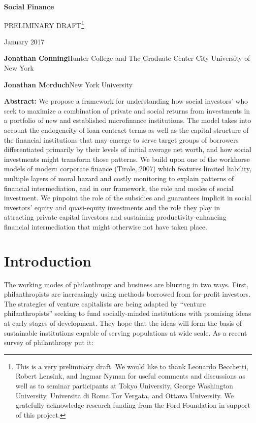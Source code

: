 \documentclass{article} %
\begin{document}
\noindent \textbf{Social Finance}

PRELIMINARY DRAFT\footnote{This is a very preliminary draft. We would like to thank Leonardo Becchetti, Robert Lensink, and Ingmar Nyman for useful comments and discussions as well as to seminar participants at Tokyo University, George Washington University, Universita di Roma Tor Vergata, and Ottawa University. We gratefully acknowledge research funding from the Ford Foundation in support of this project.}

\noindent January 2017

\noindent \textit{}



\noindent \textbf{}

\noindent \textbf{Jonathan Conning}Hunter College and The Graduate Center City University of New York 

\noindent \textbf{Jonathan M}o\textbf{rduch}New York University

\noindent 

\textbf{Abstract:  }We propose a framework for understanding how social investors' who seek to maximize a combination of private and social returns from investments in a portfolio of new and established microfinance institutions.  The model takes into account the endogeneity of loan contract terms as well as the capital structure of the financial institutions that may emerge to serve target groups of borrowers differentiated primarily by their levels of initial average net worth, and how social investments might transform those patterns. We build upon one of the workhorse models of modern corporate finance (Tirole, 2007) which features limited liability, multiple layers of moral hazard and costly monitoring to explain patterns of financial intermediation, and in our framework, the role and modes of social investment.  We pinpoint the role of the subsidies and guarantees implicit in social investors' equity and quasi-equity investments and the role they play in attracting private capital investors and sustaining productivity-enhancing financial intermediation that might otherwise not have taken place. 


\section{Introduction}

The working modes of philanthropy and business are blurring in two ways. First, philanthropists are increasingly using methods borrowed from for-profit investors. The strategies of venture capitalists are being adapted by ``venture philanthropists'' seeking to fund socially-minded institutions with promising ideas at early stages of development. They hope that the ideas will form the basis of sustainable institutions capable of serving populations at wide scale. As a recent survey of philanthropy put it: 
\end{document}
